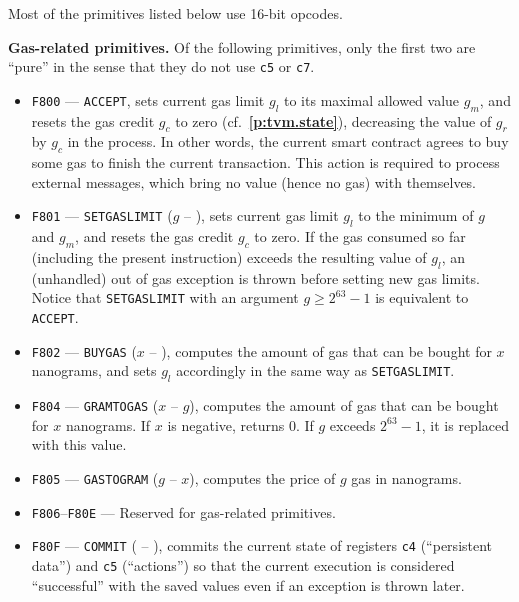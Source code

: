 \documentclass[12pt,oneside]{article}
\def\makepoint#1{\medbreak\noindent{\bf #1.\ }}
\def\nxsubpoint{\refstepcounter{subsubsection}%
  \smallbreak\makepoint{\thesubsubsection}}
\def\refpoint#1{{\rm\textbf{\ref{#1}}}}
\let\ptref=\refpoint
\def\emb#1{\textbf{#1.}}
\begin{document}
Most of the primitives listed below use 16-bit opcodes.

\nxsubpoint\emb{Gas-related primitives}
Of the following primitives, only the first two are ``pure'' in the sense that they do not use {\tt c5} or {\tt c7}.
\begin{itemize}
\item {\tt F800} --- {\tt ACCEPT}, sets current gas limit $g_l$ to its maximal allowed value $g_m$, and resets the gas credit $g_c$ to zero (cf.~\ptref{p:tvm.state}), decreasing the value of $g_r$ by $g_c$ in the process. In other words, the current smart contract agrees to buy some gas to finish the current transaction. This action is required to process external messages, which bring no value (hence no gas) with themselves.
\item {\tt F801} --- {\tt SETGASLIMIT} ($g$ -- ), sets current gas limit $g_l$ to the minimum of $g$ and $g_m$, and resets the gas credit $g_c$ to zero. If the gas consumed so far (including the present instruction) exceeds the resulting value of $g_l$, an (unhandled) out of gas exception is thrown before setting new gas limits. Notice that {\tt SETGASLIMIT} with an argument $g\geq 2^{63}-1$ is equivalent to {\tt ACCEPT}.
\item {\tt F802} --- {\tt BUYGAS} ($x$ -- ), computes the amount of gas that can be bought for $x$ nanograms, and sets $g_l$ accordingly in the same way as {\tt SETGASLIMIT}.
\item {\tt F804} --- {\tt GRAMTOGAS} ($x$ -- $g$), computes the amount of gas that can be bought for $x$ nanograms. If $x$ is negative, returns 0. If $g$ exceeds $2^{63}-1$, it is replaced with this value.
\item {\tt F805} --- {\tt GASTOGRAM} ($g$ -- $x$), computes the price of $g$ gas in nanograms.
\item {\tt F806}--{\tt F80E} --- Reserved for gas-related primitives.
\item {\tt F80F} --- {\tt COMMIT} ( -- ), commits the current state of registers {\tt c4} (``persistent data'') and {\tt c5} (``actions'') so that the current execution is considered ``successful'' with the saved values even if an exception is thrown later.
\end{itemize}
\end{document}
